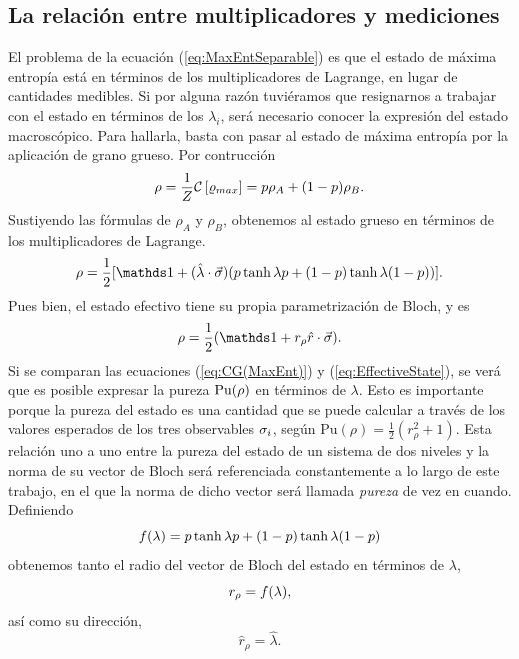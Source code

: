 \subsection{La relación entre multiplicadores y mediciones}


El problema de la ecuación (\ref{eq:MaxEntSeparable}) es que el estado de máxima entropía está en términos de los multiplicadores de Lagrange, en lugar de cantidades medibles. Si por alguna razón tuviéramos que resignarnos a trabajar con el estado en términos de los $\lambda_{i}$, será necesario conocer la expresión del estado macroscópico. Para hallarla, basta con pasar al estado de máxima entropía por la aplicación de grano grueso. Por contrucción 
\begin{equation*}
    \rho=\frac{1}{Z}\mathcal{C}\left[\varrho_{max}\right]=p\rho_{A}+(1-p)\rho_{B}.
\end{equation*}
Sustiyendo las fórmulas de $\rho_{A}$ y $\rho_{B}$, obtenemos al estado grueso en términos de los multiplicadores de Lagrange.
\begin{equation}\label{eq:CG(MaxEnt)}
  \rho=\frac{1}{2}[\Id+(\paulivec{\lambda})(p\tanh{\lambda p}+(1-p)\tanh{\lambda (1-p)})].
\end{equation}
Pues bien, el estado efectivo tiene su propia parametrización de Bloch, y es
\begin{equation}\label{eq:EffectiveState}
    \rho=\frac{1}{2}(\Id+r_{\rho}\paulivec{r}).
\end{equation}
Si se comparan las ecuaciones (\ref*{eq:CG(MaxEnt)}) y (\ref*{eq:EffectiveState}), se verá que es posible expresar la pureza $\text{Pu}(\rho)$ en términos de $\lambda$. Esto es importante porque la pureza del estado es una cantidad que se puede calcular a través de los valores esperados de los tres observables $\sigma_{i}$, según $\text{Pu}(\rho)=\frac{1}{2}(r_{\rho}^{2}+1)$. Esta relación uno a uno entre la pureza del estado de un sistema de dos niveles y la norma de su vector de Bloch será referenciada constantemente a lo largo de este trabajo, en el que la norma de dicho vector será llamada \textit{pureza} de vez en cuando. Definiendo
\begin{equation}\label{eq:r(lambda)}
    f(\lambda)=p\tanh{\lambda p}+(1-p)\tanh{\lambda (1-p)}
\end{equation}
obtenemos tanto el radio del vector de Bloch del estado en términos de $\lambda$,
\begin{equation*}
    r_{\rho}=f(\lambda),
\end{equation*}
así como su dirección,
\begin{equation*}
    \hat{r}_{\rho}=\hat{\lambda}.
\end{equation*}
